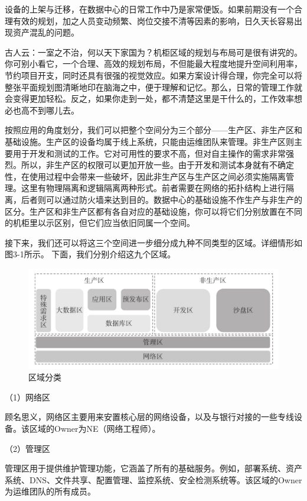 \documentclass[12pt,UTF8]{ctexbook}
\begin{document}
设备的上架与迁移，在数据中心的日常工作中乃是家常便饭。如果前期没有一个合理有效的规划，加之人员变动频繁、岗位交接不清等因素的影响，日久天长容易出现资产混乱的问题。

古人云：一室之不治，何以天下家国为？机柜区域的规划与布局可是很有讲究的。你可别小看它，一个合理、高效的规划布局，不但能最大程度地提升空间利用率，节约项目开支，同时还具有很强的视觉效应。如果方案设计得合理，你完全可以将整张平面规划图清晰地印在脑海之中，便于理解和记忆。那么，日常的管理工作就会变得更加轻松。反之，如果你走到一处，都不清楚这里是干什么的，工作效率想必也高不到哪儿去。

按照应用的角度划分，我们可以把整个空间分为三个部分——生产区、非生产区和基础设施。生产区的设备均属于线上系统，只能由运维团队来管理。非生产区则主要用于开发和测试的工作。它对可用性的要求不高，但对自主操作的需求非常强烈。所以，非生产区的权限可以更加开放一些。由于开发和测试本身就有不确定性，在使用过程中会带来一些破坏，因此非生产区与生产区之间必须实施隔离管理。这里有物理隔离和逻辑隔离两种形式。前者需要在网络的拓扑结构上进行隔离，后者则可以通过防火墙来达到目的。数据中心的基础设施不作生产与非生产的区分。生产区和非生产区都有各自对应的基础设施，你可以将它们分别放置在不同的机柜里以示区别，但它们应当依旧同属一个空间。

接下来，我们还可以将这三个空间进一步细分成九种不同类型的区域。详细情形如图3-1所示。
下面，我们分别介绍这九个区域。

\begin{figure}[htbp]
	\centering
	\includegraphics[width=1\linewidth]{5}
	\caption{区域分类}
	\label{fig:1}
\end{figure}

（1）网络区

顾名思义，网络区主要用来安置核心层的网络设备，以及与银行对接的一些专线设备。该区域的Owner为NE（网络工程师）。

（2）管理区

管理区用于提供维护管理功能，它涵盖了所有的基础服务。例如，部署系统、资产系统、DNS、文件共享、配置管理、监控系统、安全检测系统等。该区域的Owner为运维团队的所有成员。
\end{document}
